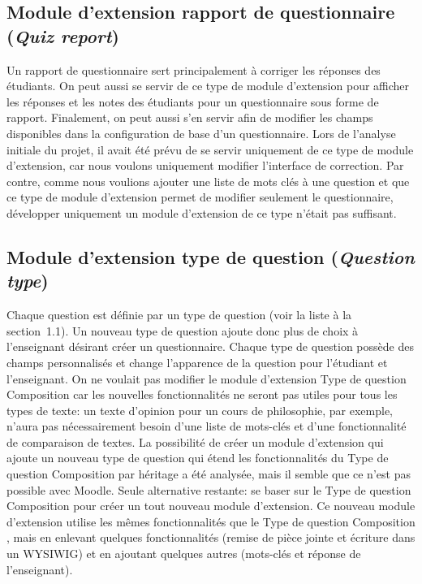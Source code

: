 \subsection{Module d'extension rapport de questionnaire (\textit{Quiz report})}
Un rapport de questionnaire sert principalement \`a corriger les r\'eponses des \'etudiants.
On peut aussi se servir de ce type de module d'extension pour afficher les r\'eponses et les notes des \'etudiants pour un questionnaire sous forme de rapport.
Finalement, on peut aussi s'en servir afin de modifier les champs disponibles dans la configuration de base d'un questionnaire.
Lors de l'analyse initiale du projet, il avait \'et\'e pr\'evu de se servir uniquement de ce type de module d'extension, car nous voulons uniquement modifier l'interface de correction.
Par contre, comme nous voulions ajouter une liste de mots cl\'es \`a une question et que ce type de module d'extension permet de modifier seulement le questionnaire, d\'evelopper uniquement un module d'extension de ce type n'\'etait pas suffisant.
\subsection{Module d'extension type de question (\textit{Question type})}
Chaque question est d\'efinie par un type de question (voir la liste \`a la section~1.1).
Un nouveau type de question ajoute donc plus de choix \`a l'enseignant d\'esirant cr\'eer un questionnaire.
Chaque type de question poss\`ede des champs personnalis\'es et change l'apparence de la question pour l'\'etudiant et l'enseignant.
On ne voulait pas modifier le module d'extension \og Type de question Composition \fg{} car les nouvelles fonctionnalit\'es ne seront pas utiles pour tous les types de texte: un texte d'opinion pour un cours de philosophie, par exemple, n'aura pas n\'ecessairement besoin d'une liste de mots-cl\'es et d'une fonctionnalit\'e de comparaison de textes.
La possibilit\'e de cr\'eer un module d'extension qui ajoute un nouveau type de question qui \'etend les fonctionnalit\'es du \og Type de question Composition \fg{} par h\'eritage a \'et\'e analys\'ee, mais il semble que ce n'est pas possible avec Moodle.
Seule alternative restante: se baser sur le \og Type de question Composition \fg{} pour cr\'eer un tout nouveau module d'extension.
Ce nouveau module d'extension utilise les m\^emes fonctionnalit\'es que le \og Type de question Composition \fg{}, mais en enlevant quelques fonctionnalit\'es (remise de pi\`ece jointe et \'ecriture dans un WYSIWIG) et en ajoutant quelques autres (mots-cl\'es et r\'eponse de l'enseignant).
